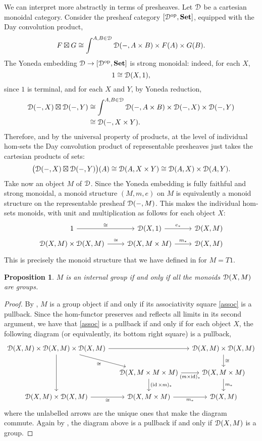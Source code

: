 \documentclass[a4paper,UKenglish,numberwithinsect,cleveref, autoref, thm-restate]{lipics-v2021}
\theoremstyle{plain} %
\newtheorem{myproposition}[mytheorem]{Proposition}
\theoremstyle{definition} %
\begin{document}
We can interpret  more abstractly in terms of presheaves.
Let $\mathcal{D}$ be a cartesian monoidal category.
Consider the presheaf category $[\mathcal{D}^\mathrm{op},\mathbf{Set}]$, equipped with the Day convolution product,
\[
 F\boxtimes G \cong \int^{A,B\in\mathcal{D}} \mathcal{D}(-, A\times B) \times F(A) \times G(B) .
\]
The Yoneda embedding $\mathcal{D}\to [\mathcal{D}^\mathrm{op},\mathbf{Set}]$ is strong monoidal: indeed, for each $X$,
\[
 1 \cong \mathcal{D}(X,1) ,
\]
since $1$ is terminal, and for each $X$ and $Y$, by Yoneda reduction,
\begin{align*}
 \mathcal{D}(-,X) \boxtimes \mathcal{D}(-,Y) &\cong \int^{A,B\in\mathcal{D}} \mathcal{D}(-, A\times B) \times \mathcal{D}(-,X) \times \mathcal{D}(-,Y) \\
  &\cong \mathcal{D}(-, X\times Y) .
\end{align*}
Therefore, and by the universal property of products, at the level of individual hom-sets the Day convolution product of representable presheaves just takes the cartesian products of sets: 
\[
 \big(\mathcal{D}(-,X) \boxtimes \mathcal{D}(-,Y)\big)(A) \cong  \mathcal{D}(A, X\times Y) \cong \mathcal{D}(A,X) \times \mathcal{D}(A,Y) .
\]
Take now an object $M$ of $\mathcal{D}$. Since the Yoneda embedding is fully faithful and strong monoidal, a monoid structure $(M,m,e)$ on $M$ is equivalently a monoid structure on the representable presheaf $\mathcal{D}(-,M)$. 
This makes the individual hom-sets monoids, with unit and multiplication as follows for each object $X$:
\[
 \begin{tikzcd}[row sep=tiny]
  1 \ar{r}{\cong} & \mD(X,1) \ar{r}{e_*} & \mD(X,M) \\
  \mD(X,M) \times \mD(X,M) \ar{r}{\cong} & \mD(X,M\times M) \ar{r}{m_*} & \mD(X,M) 
 \end{tikzcd}
\]
This is precisely the monoid structure that we have defined in  for $M=T1$. 

\begin{myproposition}
 $M$ is an internal group if and only if all the monoids $\mathcal{D}(X,M)$ are groups.
\end{myproposition}
\begin{proof}
 By , $M$ is a group object if and only if its associativity square \eqref{assoc} is a pullback. Since the hom-functor preserves and reflects all limits in its second argument, we have that \eqref{assoc} is a pullback if and only if for each object $X$, the following diagram (or equivalently, its bottom right square) is a pullback,
 \[
  \begin{tikzcd}[column sep=small]
  \mD(X,M) \times \mD(X,M) \times \mD(X,M) \ar{dr}[swap]{\cong} \ar{dd} \ar{rr} && \mD(X,M) \times \mD(X,M) \ar{d}{\cong} \\
  & \mD(X,M\times M\times M) \ar{r}[swap]{(m\times\id)_*} \ar{d}{(\id\times m)_*} & \mD(X,M\times M) \ar{d}{m_*} \\
  \mD(X,M) \times \mD(X,M) \ar{r}[swap]{\cong} & \mD(X,M\times M) \ar{r}[swap]{m_*} & \mD(X,M)
  \end{tikzcd}
 \]
 where the unlabelled arrows are the unique ones that make the diagram commute.
 Again by , the diagram above is a pullback if and only if $\mathcal{D}(X,M)$ is a group.
\end{proof}
\end{document}
